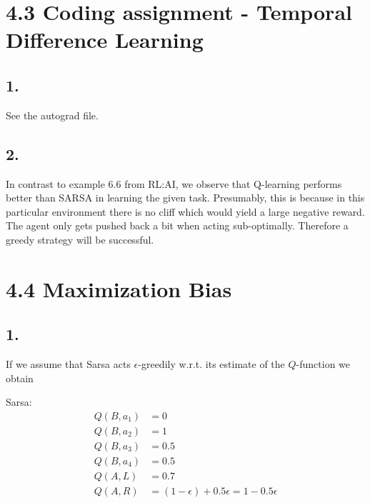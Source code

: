 \documentclass{article}
\begin{document}
\begin{comment}
\section*{3.2 Importance Sampling in Monte Carlo methods}
\subsection*{1. Disadvantage of ordinary IS in off-policy MC}

\subsection*{2. Disadvantage of weighted IS in off-policy MC}
\end{comment}


\section*{4.3 Coding assignment - Temporal Difference Learning}
\subsection*{1.}
See the autograd file.

\subsection*{2.}
In contrast to example 6.6 from RL:AI, we observe that Q-learning performs better than SARSA in learning the given task. Presumably, this is because in this particular environment there is no cliff which would yield a large negative reward. The agent only gets pushed back a bit when acting sub-optimally. Therefore a greedy strategy will be successful.

\section*{4.4 Maximization Bias}
\subsection*{1.}

If we assume that Sarsa acts $\epsilon$-greedily w.r.t. its estimate of the $Q$-function we obtain

Sarsa:
\begin{align*}
Q(B, a_1) &= 0\\
Q(B, a_2) &= 1\\
Q(B, a_3) &= 0.5\\
Q(B, a_4) &= 0.5\\
Q(A, L) &=  0.7\\
Q(A, R) &=  (1-\epsilon) + 0.5\epsilon = 1-0.5\epsilon
\end{align*}
\end{document}
